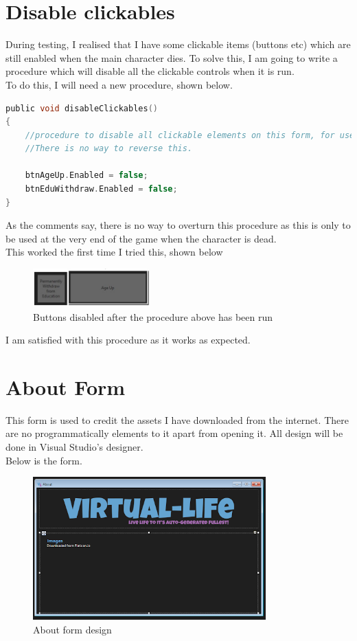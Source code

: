 \section{Disable clickables}
During testing, I realised that I have some clickable items (buttons etc) which are still enabled when the main character dies. To solve this, I am going to write a procedure which will disable all the clickable controls when it is run.\\
To do this, I will need a new procedure, shown below.
\begin{lstlisting}[language=c, style=csharp, caption=Disable clickables subroutine]
public void disableClickables()
{
    //procedure to disable all clickable elements on this form, for use when the main char dies.
    //There is no way to reverse this.

    btnAgeUp.Enabled = false;
    btnEduWithdraw.Enabled = false;
}
\end{lstlisting}
As the comments say, there is no way to overturn this procedure as this is only to be used at the very end of the game when the character is dead.\\
This worked the first time I tried this, shown below
\begin{figure}[H]
    \centering
    \includegraphics[width=0.4\textwidth]{images/implementation/disableClick1.jpg}
    \caption{Buttons disabled after the procedure above has been run}
    \label{fig:implementation-disableClick1}
\end{figure}
\noindent I am satisfied with this procedure as it works as expected.

\section{About Form}
This form is used to credit the assets I have downloaded from the internet. There are no programmatically elements to it apart from opening it. All design will be done in Visual Studio's designer.\\
Below is the form.
\begin{figure}[H]
    \centering
    \includegraphics[width=0.8\textwidth]{images/implementation/aboutForm.png}
    \caption{About form design}
    \label{fig:implementation-aboutForm}
\end{figure}

